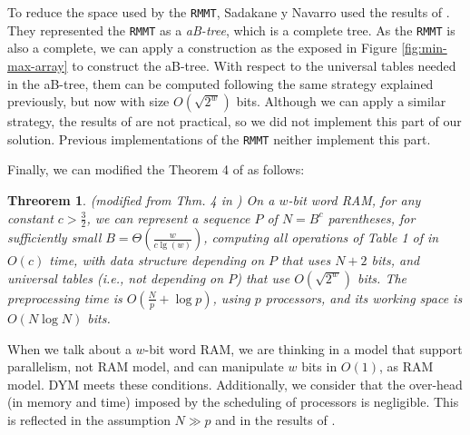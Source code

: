 To reduce the space used by the {\tt RMMT}, Sadakane y Navarro used the results of \cite{Patrascu:2008:SUC:1470582.1470670}. They represented the {\tt RMMT} as a \emph{aB-tree}, which is a complete tree. As the {\tt RMMT} is also a complete, we can apply a construction as the exposed in Figure \ref{fig:min-max-array} to construct the aB-tree. With respect to the universal tables needed in the aB-tree, them can be computed following the same strategy explained previously, but now with size $O(\sqrt{2^{w}})$ bits. Although we can apply a similar strategy, the results of \cite{Patrascu:2008:SUC:1470582.1470670} are not practical, so we did not implement this part of our solution. Previous implementations of the {\tt RMMT} neither implement this part.

Finally, we can modified the Theorem 4 of \cite{Navarro:2014:FFS:2620785.2601073} as follows:
			
			
\newtheorem{theorem}{Threorem}
\begin{theorem}
	 {\sc (modified from Thm. 4 in \cite{Navarro:2014:FFS:2620785.2601073})} On a $w$-bit word RAM, for any constant $c>\frac{3}{2}$, we can represent a sequence $P$ of $N=B^{c}$ parentheses, for sufficiently small $B=\Theta(\frac{w}{c\lg(w)})$, computing all operations of Table 1 of \cite{Navarro:2014:FFS:2620785.2601073} in $O(c)$ time, with data structure depending on $P$ that uses $N+2$ bits, and universal tables (i.e., not depending on $P$) that use $O(\sqrt{2^{w}})$ bits. The preprocessing time is $O(\frac{N}{p} + \log p)$, using $p$ processors, and its working space is $O(N\log N)$ bits.
\end{theorem}
				
	When we talk about a $w$-bit word RAM, we are thinking in a model that support parallelism, not RAM model, and can manipulate $w$ bits in $O(1)$, as RAM model. DYM meets these conditions. Additionally, we consider that the over-head (in memory and time) imposed by the scheduling of processors is negligible. This is reflected in the assumption $ N\gg p$ and in the results of \cite{Blumofe:1999:SMC:324133.324234}.
